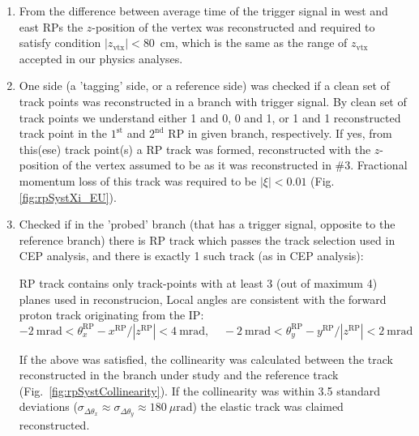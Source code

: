 \begin{enumerate}
\item From the difference between average time of the trigger signal in west and east RPs the $z$-position of the vertex was reconstructed and required to satisfy condition $|z_{\text{vtx}}|<80$~cm, which is the same as the range of $z_{\text{vtx}}$ accepted in our physics analyses.\vspace{-4pt}
\item One side (a 'tagging' side, or a reference side) was checked if a clean set of track points was reconstructed in a branch with trigger signal. By clean set of track points we understand either 1 and 0, 0 and 1, or 1 and 1 reconstructed track point in the $1^{\text{st}}$ and $2^{\text{nd}}$ RP in given branch, respectively. If yes, from this(ese) track point(s) a RP track was formed, reconstructed with the $z$-position of the vertex assumed to be as it was reconstructed in \#3. Fractional momentum loss of this track was required to be $|\xi|<0.01$ (Fig.\ref{fig:rpSystXi_EU}).\vspace{-4pt}
\item Checked if in the 'probed' branch (that has a trigger signal, opposite to the reference branch) there is RP track which passes the track selection used in CEP analysis, and there is exactly 1 such track (as in CEP analysis):\vspace*{-4pt}%
\begin{itemize}
  \itemm RP track contains only track-points with at least 3 (out of maximum 4) planes used in reconstrucion,
  \itemm Local angles are consistent with the forward proton track originating from the IP:\vspace{-5pt}
  \[-2~\text{mrad}<\theta_{x}^{\text{RP}}-x^{\text{RP}}/|z^{\text{RP}}|<4~\text{mrad},~~~~~-2~\text{mrad}<\theta_{y}^{\text{RP}}-y^{\text{RP}}/|z^{\text{RP}}|<2~\text{mrad}\]
\end{itemize}\vspace{-4pt}
If the above was satisfied, the collinearity was calculated between the track reconstructed in the branch under study and the reference track (Fig.~\ref{fig:rpSystCollinearity}). If the collinearity was within 3.5 standard deviations ($\sigma_{\Delta\theta_{x}} \approx \sigma_{\Delta\theta_{y}} \approx 180~\mu\text{rad}$) the elastic track was claimed reconstructed.
\end{enumerate}

